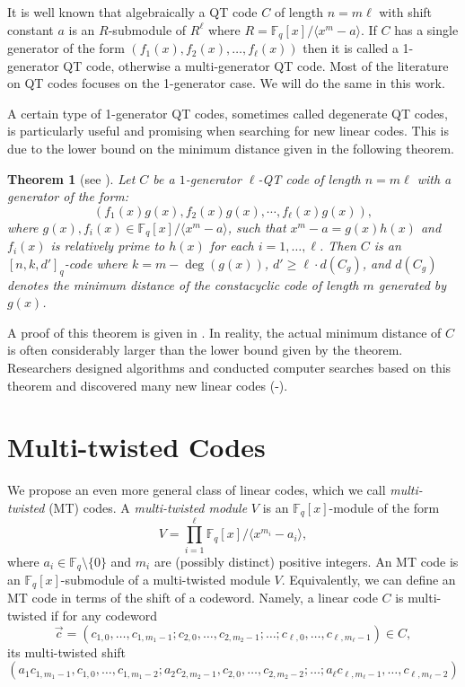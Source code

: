 \documentclass[preprint,12pt]{elsarticle}
\newtheorem{Theorem}{Theorem}[section]
\newcommand{\Fq}{\mathbb{F}_q}
\newcommand{\angbra}[1]{\langle{#1}\rangle}
\begin{document}
It is well known that algebraically a QT code $C$ of length $n=m\ell$ with shift constant $a$ is an $R$-submodule of $R^\ell$ where $R=\Fq[x]/ \langle x^m-a \rangle$. If $C$ has a single generator of the form $(f_1(x),f_2(x),\dots,f_{\ell}(x))$ then it is called a 1-generator QT code, otherwise a multi-generator QT code. Most of the literature on QT codes focuses on the 1-generator case. We will do the same in this work.

A certain type of 1-generator QT codes, sometimes called degenerate QT codes, is particularly useful and promising when searching for new linear codes.  This is due to the lower bound on the
minimum distance given in the following theorem. 
\begin{Theorem}[see \cite{qtmain}]\label{thm:lowerboundQT}%
\label{main} Let $C$ be a $1$-generator $\ell$-QT code of
length $n=m\ell$ with a generator of the form:
\begin{equation}\label{eq:one-generator-special-form}
(f_1(x)g(x),f_2(x)g(x),\cdots,f_{\ell}(x)g(x)),
\end{equation}
where $g(x),f_i(x) \in {\Fq[x]}/{\angbra{x^m-a}}$, such
that $x^m-a=g(x)h(x)$ and $f_i(x)$ is relatively prime
to $h(x)$  for each $i=1,\dots,\ell$. Then $C$ is an $[n,k,d']_q$-code where
$k=m-\deg(g(x))$, $d'\geq \ell\cdot d(C_g)$, and $d(C_g)$
denotes the minimum distance of the constacyclic code of length $m$
generated by $g(x)$.
\end{Theorem}

 A proof of this theorem is given in \cite{qtmain}. In reality, the actual
 minimum distance of $C$ is often considerably larger than the lower
 bound given by the theorem. Researchers designed algorithms and conducted computer searches based on this theorem and discovered  many new linear codes (\cite{qc3}-\cite{qc7}).


\section{Multi-twisted Codes}

We propose an even more general class of linear codes, which we call
\textit{multi-twisted} (MT) codes.  A \textit{multi-twisted
module} $V$ is an $\Fq[x]$-module of the form 
\[V = {\displaystyle\prod_{i=1}^\ell \Fq[x] / \langle x^{m_i} - a_i \rangle},\] where $a_i
\in \Fq\setminus \{0\}$ and $m_i $ are (possibly distinct) positive integers. An MT code is an $\Fq[x]$-submodule of a multi-twisted module $V$. Equivalently, we can define an MT code in terms of the shift of a codeword. Namely, a linear code $C$ is multi-twisted if for any codeword 
$$\vec{c}=(c_{1,0},\dots, c_{1,{m_1-1}}; c_{2,0},\dots, c_{2,{m_2-1}};\dots;c_{\ell,0},\dots, c_{\ell,{m_{\ell}-1}})\in C,$$
\noindent its multi-twisted shift
$$(a_1c_{1,m_1-1},c_{1,0},\dots, c_{1,{m_1-2}}; a_2c_{2,m_2-1},c_{2,0},\dots, c_{2,{m_2-2}};\dots; a_{\ell}c_{\ell,m_{\ell}-1},\dots, c_{\ell,{m_{\ell}-2}})$$
\end{document}
